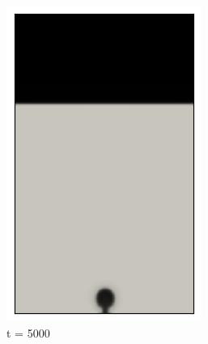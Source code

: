 \begin{figure}[H]
	\centering
	\begin{subfigure}{0.25\textwidth}
		\includegraphics[width=\linewidth]{figs/cap4/bb_760_d5}
		\caption{t = 5000}
		\label{fig:1}
	\end{subfigure}\hfil 
	\begin{subfigure}{0.25\textwidth}

\end{subfigure}
\end{figure}
